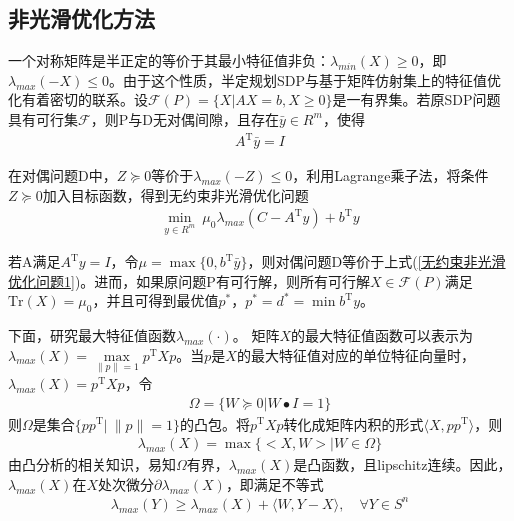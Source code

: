     \subsection{非光滑优化方法}
        \par
        一个对称矩阵是半正定的等价于其最小特征值非负：${\lambda}_{min}(X)\geqslant 0$，即${\lambda}_{max}(-X)\leqslant 0$。由于这个性质，半定规划SDP与基于矩阵仿射集上的特征值优化有着密切的联系。设${\mathscr{F}}(P)=\{X|AX=b,X\geqslant 0\}$是一有界集。若原SDP问题具有可行集${\mathscr{F}}$，则P与D无对偶间隙，且存在$\bar{y}\in R^m$，使得
        \begin{align*}
        A^\mathrm{T} \bar{y}=I
        \end{align*}
        \par
        在对偶问题D中，$Z\succeq 0$等价于${\lambda}_{max}(-Z)\leqslant 0$，利用Lagrange乘子法，将条件$Z\succeq 0$加入目标函数，得到无约束非光滑优化问题
        \begin{align}
        \label{无约束非光滑优化问题1}
        \mathop{\min}\limits_{y \in R^m}\ {\mu}_0{\lambda}_{max}(C-A^\mathrm{T} y)+b^\mathrm{T} y
        \end{align}
        \begin{lemma}
        若A满足$A^\mathrm{T} y=I$，令$\mu =\max\{0,b^\mathrm{T} \bar{y}\}$，则对偶问题D等价于上式(\ref{无约束非光滑优化问题1})。进而，如果原问题P有可行解，则所有可行解$X\in {\mathscr{F}}(P)$满足$\mathrm{Tr}(X)={\mu}_0$，并且可得到最优值$p^*$，$p^*=d^*=\min b^\mathrm{T} y$。
        \end{lemma}
        \par
        下面，研究最大特征值函数${\lambda}_{max}(\cdot)$。
        矩阵$X$的最大特征值函数可以表示为${\lambda}_{max}(X)=\mathop{\max}\limits_{\|p\|=1}p^\mathrm{T} Xp$。当$p$是$X$的最大特征值对应的单位特征向量时，${\lambda}_{max}(X)=p^\mathrm{T} Xp$，令
        \begin{align*}
        \Omega=\{W\succeq 0|W \bullet I =1 \}
        \end{align*}
        则$\Omega$是集合$\{pp^\mathrm{T} |\ \|p\|=1\}$的凸包。将$p^\mathrm{T} Xp$转化成矩阵内积的形式$\langle{X,pp^\mathrm{T} }\rangle$，则
        \begin{align*}
        {\lambda}_{max}(X) = \max\{ \big<X,W\big>|W \in \Omega \}
        \end{align*}
        由凸分析的相关知识，易知$\Omega$有界，$\lambda_{max}(X)$是凸函数，且lipschitz连续。因此，$\lambda_{max}(X)$在$X$处次微分$\partial \lambda_{max}(X)$，即满足不等式
        \begin{align*}
        {\lambda}_{max}(Y)\geqslant {\lambda}_{max}(X)+\langle{W,Y-X}\rangle,\quad \forall Y\in S^n
        \end{align*}
